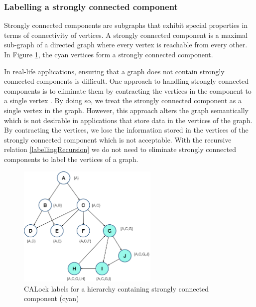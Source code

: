 \subsubsection{Labelling a strongly connected component}
Strongly connected components are subgraphs that exhibit special properties in terms of connectivity of vertices. 
A strongly connected component is a maximal sub-graph of a directed graph where every vertex is reachable from every other. 
In Figure \ref{fig:stronglyConnectedComponent}, the cyan vertices form a strongly connected component.


In real-life applications, ensuring that a graph does not contain strongly connected components is difficult. 
One approach to handling strongly connected components is to eliminate them by contracting the vertices in the component to a single vertex \cite{sharir1981strong, tarjan1972depth, cheriyan1996algorithms,walsh2006hub}. By doing so, we treat the strongly connected component as a single vertex in the graph. 
However, this approach alters the graph semantically which is not desirable in applications that store data in the vertices of the graph. By contracting the vertices, we lose the information stored in the vertices of the strongly connected component which is not acceptable. 
With the recursive relation \ref{labellingRecursion} we do not need to eliminate strongly connected components to label the vertices of a graph. 



\begin{figure}
	\centering
	\captionsetup{justification=centering}
	\includegraphics[width=0.6\textwidth]{figures/CALock_ConnectedComponent.png}
	\caption{CALock labels for a hierarchy containing strongly connected component (cyan)}
	\label{fig:stronglyConnectedComponent}
\end{figure}

